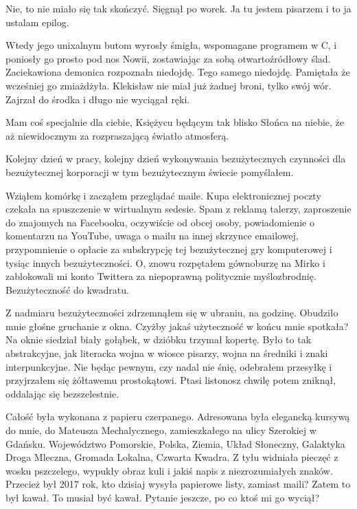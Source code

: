 \begin{dialogue}
\ds{} Nie, to nie miało się tak skończyć. \dm{} Sięgnął po worek. \dm{} Ja tu jestem pisarzem i to ja ustalam epilog. 
\end{dialogue}

Wtedy jego unixalnym butom wyrosły śmigła, wspomagane programem w C, i poniosły go prosto pod nos Nowii, zostawiając za sobą otwartoźródłowy ślad.
Zaciekawiona demonica rozpoznała niedojdę. Tego samego niedojdę. Pamiętała że wcześniej go zmiażdżyła.
Klekisław nie miał już żadnej broni, tylko swój wór. Zajrzał do środka i długo nie wyciągał ręki.
\begin{dialogue}
\ds{} Mam coś specjalnie dla ciebie, Księżycu będącym tak blisko Słońca na niebie, że aż niewidocznym za rozpraszającą światło atmosferą.
\end{dialogue}

\divider{}

\begin{dialogue}
\ds{} Kolejny dzień w pracy, kolejny dzień wykonywania bezużytecznych czynności dla bezużytecznej korporacji w tym bezużytecznym świecie \dm{} pomyślałem.
\end{dialogue}

Wziąłem komórkę i zacząłem przeglądać maile. Kupa elektronicznej poczty czekała na spuszczenie w wirtualnym sedesie.
Spam z reklamą talerzy, zaproszenie do znajomych na Facebooku, oczywiście od obcej osoby, powiadomienie o komentarzu na YouTube,
uwaga o mailu na innej skrzynce emailowej, przypomnienie o opłacie za subskrypcję tej bezużytecznej gry komputerowej i tysiąc innych bezużyteczności.
O, znowu rozpętałem gównoburzę na Mirko i zablokowali mi konto Twittera za niepoprawną politycznie myślozbrodnię.
Bezużyteczność do kwadratu.

Z nadmiaru bezużyteczności zdrzemnąłem się w ubraniu, na godzinę. Obudziło mnie głośne gruchanie z okna.
Czyżby jakaś użyteczność w końcu mnie spotkała?
Na oknie siedział biały gołąbek, w dzióbku trzymał kopertę. Było to tak abstrakcyjne, jak literacka wojna w wiosce pisarzy, wojna na średniki i znaki interpunkcyjne.
Nie będąc pewnym, czy nadal nie śnię, odebrałem przesyłkę i przyjrzałem się żółtawemu prostokątowi.
Ptasi listonosz chwilę potem zniknął, oddalając się bezszelestnie.

Całość była wykonana z papieru czerpanego.
Adresowana była elegancką kursywą do mnie, do Mateusza Mechalycznego, zamieszkałego na ulicy Szerokiej w Gdańsku.
Województwo Pomorskie, Polska, Ziemia, Układ Słoneczny, Galaktyka Droga Mleczna, Gromada Lokalna, Czwarta Kwadra.
Z tyłu widniała pieczęć z wosku pszczelego, wypukły obraz kuli i jakiś napis z niezrozumiałych znaków.
Przecież był 2017 rok, kto dzisiaj wysyła papierowe listy, zamiast maili?
Zatem to był kawał. To musiał być kawał. Pytanie jeszcze, po co ktoś mi go wyciął?

